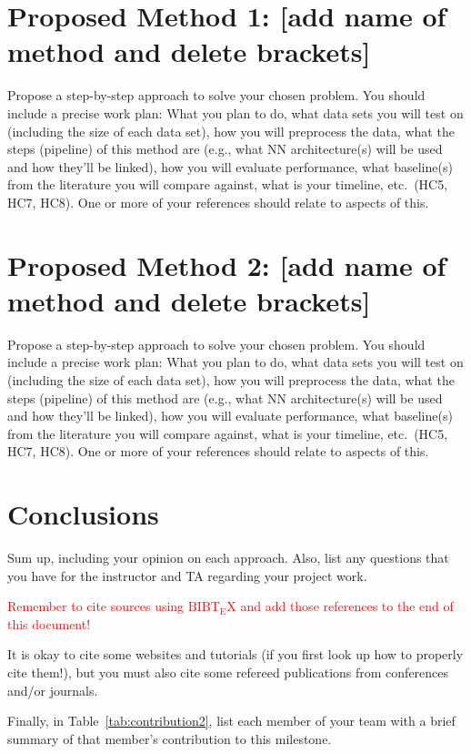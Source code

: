 \documentclass{report}
\begin{document}
\section{Proposed Method 1: [add name of method and delete brackets]}

Propose a step-by-step approach to solve your chosen problem.  You should include 
a precise work plan: What you plan to do, what data sets you will test on (including the size of each data set), how you will preprocess the data, what the steps (pipeline) of this method are (e.g., what NN architecture(s) will be used and how they'll be linked), how you will evaluate performance, what baseline(s) from the literature you will compare against, what is your timeline, etc.\ (HC5, HC7, HC8).  One or more of your references should relate to aspects of this. 


\section{Proposed Method 2: [add name of method and delete brackets]}

Propose a step-by-step approach to solve your chosen problem.  You should include 
a precise work plan: What you plan to do, what data sets you will test on (including the size of each data set), how you will preprocess the data, what the steps (pipeline) of this method are  (e.g., what NN architecture(s) will be used and how they'll be linked), how you will evaluate performance, what baseline(s) from the literature you will compare against, what is your timeline, etc.\ (HC5, HC7, HC8).  One or more of your references should relate to aspects of this. 

\section{Conclusions}

Sum up, including your opinion on each approach.  Also, list any questions that you have for the instructor and TA regarding your project work.

\textcolor{red}{Remember to cite sources using   ${\mathrm {B{\scriptstyle {IB}}\!T\!_{\displaystyle E}\!X} }$   and add those references to the end of this document!}

It is okay to cite some websites and tutorials (if you first look up how to properly cite them!), but you must also cite some refereed publications from conferences and/or journals.

Finally, in Table~\ref{tab:contribution2}, list each member of your team with a brief summary of that member's contribution to this milestone.
\end{document}
